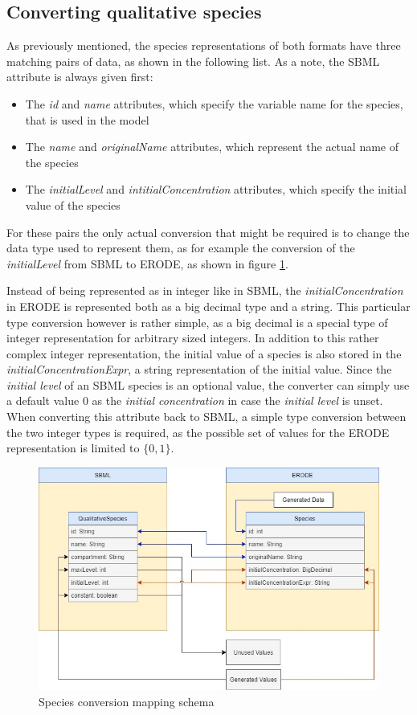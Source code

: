 \subsection{Converting qualitative species}
As previously mentioned, the species representations of both formats have three matching pairs of data, as shown in the following list. As a note, the SBML attribute is always given first:
\begin{itemize}
    \item The \emph{id} and \emph{name} attributes, which specify the variable name for the species, that is used in the model
    \item The \emph{name} and \emph{originalName} attributes, which represent the actual name of the species
    \item The \emph{initialLevel} and \emph{intitialConcentration} attributes, which specify the initial value of the species
\end{itemize}
For these pairs the only actual conversion that might be required is to change the data type used to represent them, as for example the conversion of the \emph{initialLevel} from SBML to ERODE, as shown in figure \ref{speciesConversion}.

Instead of being represented as in integer like in SBML, the \emph{initialConcentration} in ERODE is represented both as a big decimal type and a string. This particular type conversion however is rather simple, as a big decimal is a special type of integer representation for arbitrary sized integers. 
In addition to this rather complex integer representation, the initial value of a species is also stored in the \emph{initialConcentrationExpr}, a string representation of the initial value. Since the \emph{initial level} of an SBML species is an optional value, the converter can simply use a default value $0$ as the \emph{initial concentration} in case the \emph{initial level} is unset. When converting this attribute back to SBML, a simple type conversion between the two integer types is required, as the possible set of values for the ERODE representation is limited to $\{0,1\}$.

\begin{figure}[H]
    \centering
    \includegraphics[scale=0.45]{Sections/Images/SpeciesConversionMapping.jpg}
    \caption{Species conversion mapping schema}
    \label{speciesConversion}
\end{figure}

